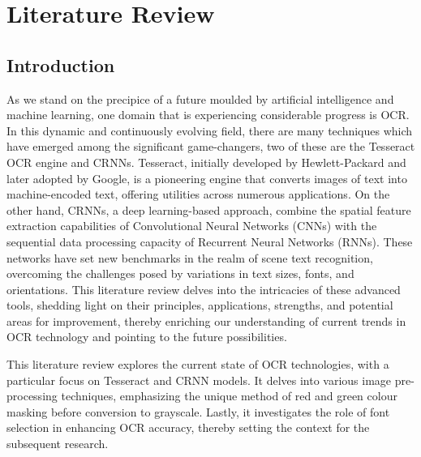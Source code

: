 \chapter{Literature Review}
\label{chap:litreview}


\section{Introduction}



As we stand on the precipice of a future moulded by artificial intelligence and machine learning, one domain that is experiencing considerable progress is OCR. In this dynamic and continuously evolving field, there are many techniques which have emerged among the significant game-changers, two of these are the Tesseract OCR engine and CRNNs. Tesseract, initially developed by Hewlett-Packard and later adopted by Google, is a pioneering engine that converts images of text into machine-encoded text, offering utilities across numerous applications. On the other hand, CRNNs, a deep learning-based approach, combine the spatial feature extraction capabilities of Convolutional Neural Networks (CNNs) with the sequential data processing capacity of Recurrent Neural Networks (RNNs). These networks have set new benchmarks in the realm of scene text recognition, overcoming the challenges posed by variations in text sizes, fonts, and orientations. This literature review delves into the intricacies of these advanced tools, shedding light on their principles, applications, strengths, and potential areas for improvement, thereby enriching our understanding of current trends in OCR technology and pointing to the future possibilities.



This literature review explores the current state of OCR technologies, with a particular focus on Tesseract and CRNN models. It delves into various image pre-processing techniques, emphasizing the unique method of red and green colour masking before conversion to grayscale. Lastly, it investigates the role of font selection in enhancing OCR accuracy, thereby setting the context for the subsequent research.

